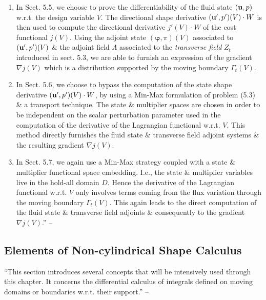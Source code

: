 \documentclass[oneside]{book}
\numberwithin{equation}{section}
\begin{document}
\begin{enumerate}
	\item In Sect. 5.5, we choose to prove the differentiability of the fluid state $({\bf u},p)$ w.r.t. the design variable $V$. The directional shape derivative $({\bf u}',p')(V)\cdot W$ is then used to compute the directional derivative $j'(V)\cdot W$ of the cost functional $j(V)$. Using the adjoint state $(\boldsymbol{\varphi},\pi)(V)$ associated to $({\bf u}',p')(V)$ \& the adjoint field $\Lambda$ associated to the \textit{transverse field} $Z_t$ introduced in sect. 5.3, we are able to furnish an expression of the gradient $\nabla j(V)$ which is a distribution supported by the moving boundary $\Gamma_t(V)$.
	\item In Sect. 5.6, we choose to bypass the computation of the state shape derivative $({\bf u}',p')(V)\cdot W$, by using a Min-Max formulation of problem (5.3) \& a transport technique. The state \& multiplier spaces are chosen in order to be independent on the scalar perturbation parameter used in the computation of the derivative of the Lagrangian functional w.r.t. $V$. This method directly furnishes the fluid state \& transverse field adjoint systems \& the resulting gradient $\nabla j(V)$.
	\item In Sect. 5.7, we again use a Min-Max strategy coupled with a state \& multiplier functional space embedding. I.e., the state \& multiplier variables live in the hold-all domain $D$. Hence the derivative of the Lagrangian functional w.r.t. $V$ only involves terms coming from the flux variation through the moving boundary $\Gamma_t(V)$. This again leads to the direct computation of the fluid state \& transverse field adjoints \& consequently to the gradient $\nabla j(V)$.'' -- \cite[Chap. 5, Sect. 5.2, pp. 110--114]{Moubachir_Zolesio2006}
\end{enumerate}

\subsection{Elements of Non-cylindrical Shape Calculus}
``This section introduces several concepts that will be intensively used through this chapter. It concerns the differential calculus of integrals defined on moving domains or boundaries w.r.t.  their support.'' -- \cite[Chap. 5, Sect. 5.3, p. 114]{Moubachir_Zolesio2006}
\end{document}
